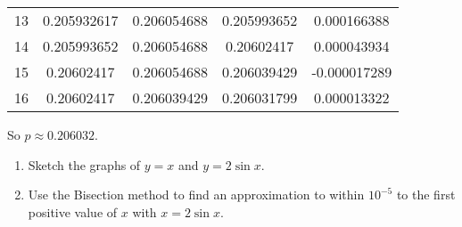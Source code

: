 \documentclass[../../Assignments.tex]{subfiles}
\begin{document}
\begin{solution}
\begin{enumerate}
\begin{table}
\begin{longtable}{r S[table-format=1.9] S[table-format=1.9] S[table-format=1.9] S[table-format=-1.9]}
                       13  &  0.205932617  &  0.206054688  &  0.205993652  &   0.000166388  \\
                       14  &  0.205993652  &  0.206054688  &  0.20602417   &   0.000043934  \\
                       15  &  0.20602417   &  0.206054688  &  0.206039429  &  -0.000017289  \\
                       16  &  0.20602417   &  0.206039429  &  0.206031799  &   0.000013322  \\
                       \bottomrule
                \end{longtable}
            \end{table}

            So \(p \approx \num{0.206032}\).
    \end{enumerate}
\end{solution}

\begin{exercise}
    \begin{enumerate}[label=(\alph*)]
        \item Sketch the graphs of \(y = x\) and \(y = 2 \sin{x}\).
        \item Use the Bisection method to find an approximation to within
            \(10^{−5}\) to the first positive value of \(x\) with \(x = 2
            \sin{x}\).
    \end{enumerate}
\end{exercise}
\end{document}
